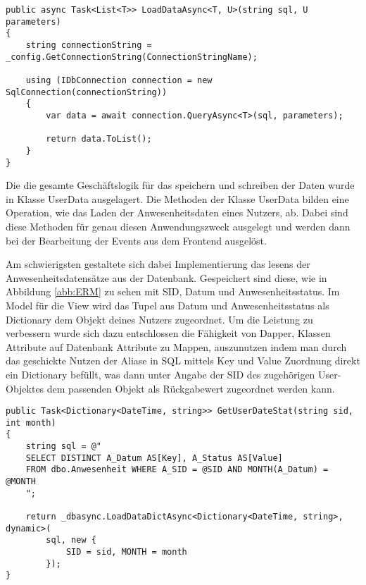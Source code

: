 \begin{lstlisting}[frame=single,caption={Die Methode {\normalfont \ttfamily  LoadDataAsync} aus der SQLDataAccessAsync Klasse}, label={lst:LoadDataAsync}]
public async Task<List<T>> LoadDataAsync<T, U>(string sql, U parameters)
{
    string connectionString = _config.GetConnectionString(ConnectionStringName);

    using (IDbConnection connection = new SqlConnection(connectionString))
    {
        var data = await connection.QueryAsync<T>(sql, parameters);

        return data.ToList();
    }
}
\end{lstlisting}

Die die gesamte Geschäftslogik für das speichern und schreiben der Daten wurde in Klasse UserData ausgelagert. Die Methoden der Klasse UserData bilden eine Operation, wie \zB das Laden der Anwesenheitsdaten eines Nutzers, ab. Dabei sind diese Methoden für genau diesen Anwendungszweck ausgelegt und werden dann bei der Bearbeitung der Events aus dem Frontend ausgelöst.

Am schwierigsten gestaltete sich dabei Implementierung das lesens der Anwesenheitsdatensätze aus der Datenbank. Gespeichert sind diese, wie in Abbildung \ref{abb:ERM} zu sehen mit SID, Datum und Anwesenheitsstatus. Im Model für die View wird das Tupel aus Datum und Anwesenheitsstatus als Dictionary dem Objekt deines Nutzers zugeordnet. Um die Leistung zu verbessern wurde sich dazu entschlossen die Fähigkeit von Dapper, Klassen Attribute auf Datenbank Attribute zu Mappen, auszunutzen indem man durch das geschickte Nutzen der Aliase in SQL mittels Key und Value Zuordnung direkt ein Dictionary befüllt, was dann unter Angabe der SID des zugehörigen User-Objektes dem passenden Objekt als Rückgabewert zugeordnet werden kann.
\\
\begin{lstlisting}[frame=single,caption={Die Methode {\normalfont \ttfamily  GetUserDateStat} aus der UserData Klasse}, label={lst:GetUserDateStat}]
public Task<Dictionary<DateTime, string>> GetUserDateStat(string sid, int month)
{
    string sql = @"
    SELECT DISTINCT A_Datum AS[Key], A_Status AS[Value]
    FROM dbo.Anwesenheit WHERE A_SID = @SID AND MONTH(A_Datum) = @MONTH
    ";

    return _dbasync.LoadDataDictAsync<Dictionary<DateTime, string>, dynamic>(
        sql, new {
            SID = sid, MONTH = month
        });
}
\end{lstlisting}

